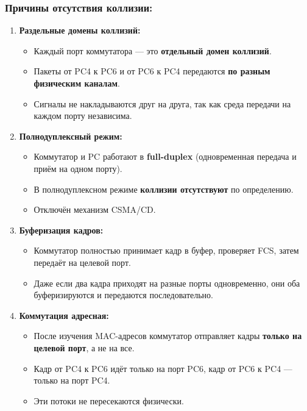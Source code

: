 \begin{enumerate}
\subsubsection*{Причины отсутствия коллизии:}
\begin{enumerate}
    \item \textbf{Раздельные домены коллизий:}
    \begin{itemize}
        \item Каждый порт коммутатора — это \textbf{отдельный домен коллизий}.
        \item Пакеты от PC4 к PC6 и от PC6 к PC4 передаются \textbf{по разным физическим каналам}.
        \item Сигналы не накладываются друг на друга, так как среда передачи на каждом порту независима.
    \end{itemize}
    \item \textbf{Полнодуплексный режим:}
    \begin{itemize}
        \item Коммутатор и PC работают в \textbf{full-duplex} (одновременная передача и приём на одном порту).
        \item В полнодуплексном режиме \textbf{коллизии отсутствуют} по определению.
        \item Отключён механизм CSMA/CD.
    \end{itemize}
    \item \textbf{Буферизация кадров:}
    \begin{itemize}
        \item Коммутатор полностью принимает кадр в буфер, проверяет FCS, затем передаёт на целевой порт.
        \item Даже если два кадра приходят на разные порты одновременно, они оба буферизируются и передаются последовательно.
    \end{itemize}
    \item \textbf{Коммутация адресная:}
    \begin{itemize}
        \item После изучения MAC-адресов коммутатор отправляет кадры \textbf{только на целевой порт}, а не на все.
        \item Кадр от PC4 к PC6 идёт только на порт PC6, кадр от PC6 к PC4 — только на порт PC4.
        \item Эти потоки не пересекаются физически.
    \end{itemize}
\end{enumerate}


\end{enumerate}
